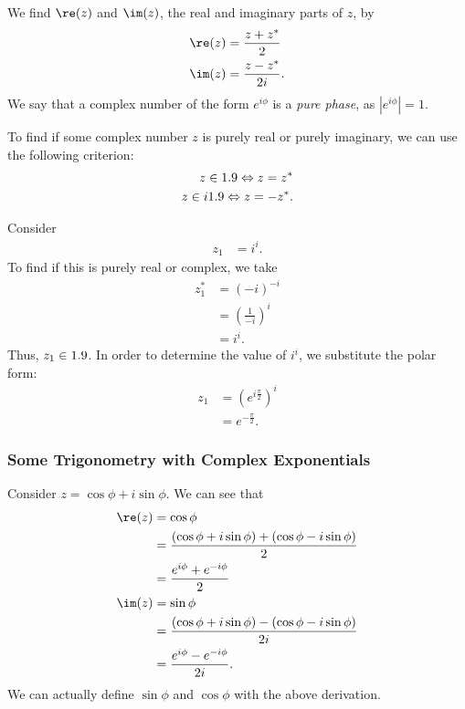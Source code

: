 \documentclass[10pt]{mypackage}
\begin{document}
We find $\re(z)$ and $\im(z)$, the real and imaginary parts of $z$, by
\begin{align*}
  \re(z) &= \frac{z + z^{\ast}}{2}\\
  \im(z) &= \frac{z - z^{\ast}}{2i}.
\end{align*}
We say that a complex number of the form $e^{i\phi}$ is a \textit{pure phase}, as $\left\vert e^{i\phi} \right\vert = 1$.\newline

To find if some complex number $z$ is purely real or purely imaginary, we can use the following criterion:
\begin{align*}
  z\in 1.9 \Leftrightarrow z = z^{\ast}\\
  z\in i1.9 \Leftrightarrow z = -z^{\ast}.
\end{align*}
\begin{example}
  Consider
  \begin{align*}
    z_1 &= i^{i}.
  \end{align*}
  To find if this is purely real or complex, we take
  \begin{align*}
    z_1^{\ast} &= \left(-i\right)^{-i}\\
               &= \left(\frac{1}{-i}\right)^{i}\\
               &= i^{i}.
  \end{align*}
  Thus, $z_1\in 1.9$. In order to determine the value of $i^i$, we substitute the polar form:
  \begin{align*}
    z_1 &= \left(e^{i\frac{\pi}{2}}\right)^{i}\\
        &= e^{-\frac{\pi}{2}}.
  \end{align*}
\end{example}
\subsubsection{Some Trigonometry with Complex Exponentials}%
Consider $z = \cos \phi + i\sin\phi$. We can see that
\begin{align*}
  \re(z) &= \cos\phi\\
         &= \frac{\left(\cos \phi + i\sin\phi\right) + \left(\cos\phi - i\sin\phi\right)}{2}\\
         &= \frac{e^{i\phi} + e^{-i\phi}}{2}\\
  \im(z) &= \sin\phi\\
         &= \frac{\left(\cos\phi + i\sin\phi\right) - \left(\cos\phi - i\sin\phi\right)}{2i}\\
         &= \frac{e^{i\phi} - e^{-i\phi}}{2i}.
\end{align*}
We can actually define $\sin\phi$ and $\cos\phi$ with the above derivation.\newline
\end{document}
